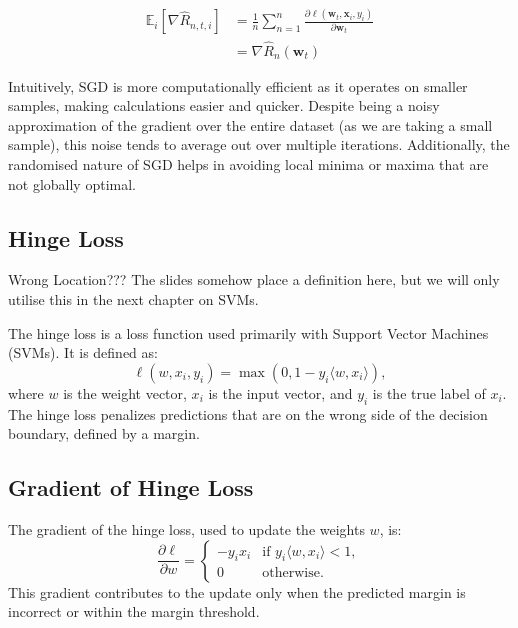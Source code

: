 \begin{align*}
\mathbb{E}_i\left[\nabla\hat{R}_{n,t,i}\right] &= \frac{1}{n}\sum_{n=1}^{n} \frac{\partial\ell(\mathbf{w}_{t},\mathbf{x}_{i},y_{i})}{\partial\mathbf{w}_{t}} \\
&= \nabla\hat{R}_n(\mathbf{w}_t)
\end{align*}

Intuitively, SGD is more computationally efficient as it operates on smaller samples, making calculations easier and quicker. Despite being a noisy approximation of the gradient over the entire dataset (as we are taking a small sample), this noise tends to average out over multiple iterations. Additionally, the randomised nature of SGD helps in avoiding local minima or maxima that are not globally optimal.\\

\subsection*{Hinge Loss}

\begin{commentbox}{Wrong Location???}
    The slides somehow place a definition here, but we will only utilise this in the next chapter on SVMs.
\end{commentbox}
The hinge loss is a loss function used primarily with Support Vector Machines (SVMs). It is defined as:
\begin{equation}
    \ell(w, x_i, y_i) = \max(0, 1 - y_i \langle w, x_i \rangle),
\end{equation}
where \( w \) is the weight vector, \( x_i \) is the input vector, and \( y_i \) is the true label of \( x_i \). The hinge loss penalizes predictions that are on the wrong side of the decision boundary, defined by a margin.

\subsection*{Gradient of Hinge Loss}
The gradient of the hinge loss, used to update the weights \( w \), is:
\begin{equation}
    \frac{\partial \ell}{\partial w} =
    \begin{cases}
        -y_i x_i & \text{if } y_i \langle w, x_i \rangle < 1, \\
        0 & \text{otherwise}.
    \end{cases}
\end{equation}
This gradient contributes to the update only when the predicted margin is incorrect or within the margin threshold.


